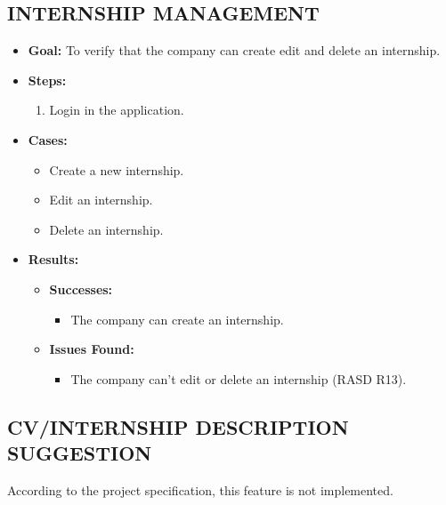 \subsection{INTERNSHIP MANAGEMENT}\label{subsec:internship-management}
\begin{itemize}
    \item \textbf{Goal:} To verify that the company can create edit and delete an internship.

    \item \textbf{Steps:}
    \begin{enumerate}
        \item Login in the application.

    \end{enumerate}
    \item \textbf{Cases:}
    \begin{itemize}
        \item Create a new internship.
        \item Edit an internship.
        \item Delete an internship.
    \end{itemize}
    \item \textbf{Results:}
    \begin{itemize}
        \item \textbf{Successes:}
        \begin{itemize}
            \item The company can create an internship.
        \end{itemize}
        \item \textbf{Issues Found:}
        \begin{itemize}
            \item The company can't edit or delete an internship (RASD R13).
        \end{itemize}
    \end{itemize}
\end{itemize}

\subsection{CV/INTERNSHIP DESCRIPTION SUGGESTION}\label{subsec:cv-internship-description-suggestion}
According to the project specification, this feature is not implemented.


